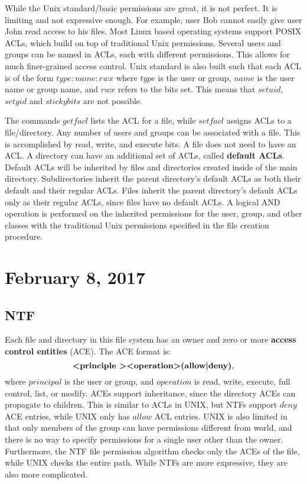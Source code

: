 \documentclass[11pt]{article}
\theoremstyle{plain} %
\theoremstyle{definition}
\theoremstyle{example}
\theoremstyle{remark}
\begin{document}
While the Unix standard/basic permissions are great, it is not perfect. It is limiting and not expressive enough. For example, user Bob cannot easily give user John read access to his files. Most Linux based operating systems support POSIX ACLs, which build on top of traditional Unix permissions. Several users and groups can be named in ACLs, each with different permissions. This allows for much finer-grained access control. Unix standard is also built such that each ACL is of the form $type:name:rwx$ where $type$ is the user or group, $name$ is the user name or group name, and $rwx$ refers to the bits set. This means that $setuid$, $setgid$ and $sticky bits$ are not possible. 

The commands $getfacl$ lists the ACL for a file, while $setfacl$ assigns ACLs to a file/directory.
Any number of users and groups can be associated with a file. This is accomplished by read, write, and execute bits. A file does not need to have an ACL. A directory can have an additional set of ACLs, called \textbf{default ACLs}. Default ACLs will be inherited by files and directories created inside of the main directory. Subdirectories inherit the parent directory's default ACLs as both their default and their regular ACLs. Files inherit the parent directory's default ACLs only as their regular ACLs, since files have no default ACLs. A logical AND operation is performed on the inherited permissions for the user, group, and other classes with the traditional Unix permissions specified in the file creation procedure.

\section{February 8, 2017}
\subsection{NTF}

Each file and directory in this file system has an owner and zero or more \textbf{access control entities} (ACE). The ACE format is:
$$\textbf{\textless principle \textgreater \textless operation\textgreater (allow\textbar deny)},$$
where $principal$ is the user or group, and $operation$ is read, write, execute, full control, list, or modify. ACEs support inheritance, since the directory ACEs can propagate to children. This is similar to ACLs in UNIX, but NTFs support $deny$ ACE entries, while UNIX only has $allow$ ACL entries. UNIX is also limited in that only members of the group can have permissions different from world, and there is no way to specify permissions for a single user other than the owner. Furthermore, the NTF file permission algorithm checks only the ACEs of the file, while UNIX checks the entire path. While NTFs are more expressive, they are also more complicated. 
\end{document}
